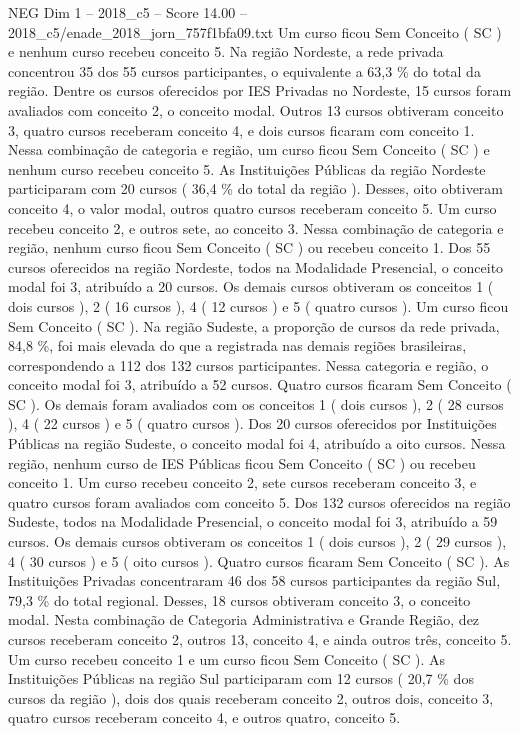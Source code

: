 \begin{textsample}{NEG Dim 1 – 2018\_c5 – Score 14.00 – 2018\_c5/enade\_2018\_jorn\_757f1bfa09.txt}
Um curso ficou Sem Conceito ( SC ) e nenhum curso recebeu conceito 5.
Na região Nordeste, a rede privada concentrou 35 dos 55 cursos participantes, o equivalente a 63,3 \% do total da região.
Dentre os cursos oferecidos por IES Privadas no Nordeste, 15 cursos foram avaliados com conceito 2, o conceito modal.
Outros 13 cursos obtiveram conceito 3, quatro cursos receberam conceito 4, e dois cursos ficaram com conceito 1.
Nessa combinação de categoria e região, um curso ficou Sem Conceito ( SC ) e nenhum curso recebeu conceito 5.
As Instituições Públicas da região Nordeste participaram com 20 cursos ( 36,4 \% do total da região ).
Desses, oito obtiveram conceito 4, o valor modal, outros quatro cursos receberam conceito 5.
Um curso recebeu conceito 2, e outros sete, ao conceito 3.
Nessa combinação de categoria e região, nenhum curso ficou Sem Conceito ( SC ) ou recebeu conceito 1.
Dos 55 cursos oferecidos na região Nordeste, todos na Modalidade Presencial, o conceito modal foi 3, atribuído a 20 cursos.
Os demais cursos obtiveram os conceitos 1 ( dois cursos ), 2 ( 16 cursos ), 4 ( 12 cursos ) e 5 ( quatro cursos ).
Um curso ficou Sem Conceito ( SC ).
Na região Sudeste, a proporção de cursos da rede privada, 84,8 \%, foi mais elevada do que a registrada nas demais regiões brasileiras, correspondendo a 112 dos 132 cursos participantes.
Nessa categoria e região, o conceito modal foi 3, atribuído a 52 cursos.
Quatro cursos ficaram Sem Conceito ( SC ).
Os demais foram avaliados com os conceitos 1 ( dois cursos ), 2 ( 28 cursos ), 4 ( 22 cursos ) e 5 ( quatro cursos ).
Dos 20 cursos oferecidos por Instituições Públicas na região Sudeste, o conceito modal foi 4, atribuído a oito cursos.
Nessa região, nenhum curso de IES Públicas ficou Sem Conceito ( SC ) ou recebeu conceito 1.
Um curso recebeu conceito 2, sete cursos receberam conceito 3, e quatro cursos foram avaliados com conceito 5.
Dos 132 cursos oferecidos na região Sudeste, todos na Modalidade Presencial, o conceito modal foi 3, atribuído a 59 cursos.
Os demais cursos obtiveram os conceitos 1 ( dois cursos ), 2 ( 29 cursos ), 4 ( 30 cursos ) e 5 ( oito cursos ).
Quatro cursos ficaram Sem Conceito ( SC ).
As Instituições Privadas concentraram 46 dos 58 cursos participantes da região Sul, 79,3 \% do total regional.
Desses, 18 cursos obtiveram conceito 3, o conceito modal.
Nesta combinação de Categoria Administrativa e Grande Região, dez cursos receberam conceito 2, outros 13, conceito 4, e ainda outros três, conceito 5.
Um curso recebeu conceito 1 e um curso ficou Sem Conceito ( SC ).
As Instituições Públicas na região Sul participaram com 12 cursos ( 20,7 \% dos cursos da região ), dois dos quais receberam conceito 2, outros dois, conceito 3, quatro cursos receberam conceito 4, e outros quatro, conceito 5.

\end{textsample}
